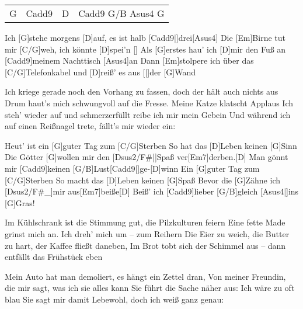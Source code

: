 

\vspace{-0.5em}

\begin{guitar}
	{\footnotesize\begin{tabular}{l|l|l|l}
			G & Cadd9 & D & Cadd9 G/B Asus4 G
	\end{tabular}}

	Ich [G]stehe morgens [D]auf, es ist halb [Cadd9|]{drei}[Asus4]{}
	Die [Em]Birne tut mir [C/G]weh, ich könnte [D]spei'n []{}
	Als [G]erstes hau' ich [D]mir den Fuß an [Cadd9]meinem Nachttisch [Asus4]an
	Dann [Em]stolpere ich über das [C/G]Telefonkabel und [D]reiß' es aus [|]{der} [G]Wand
	
	Ich kriege gerade noch den Vorhang zu fassen, doch der hält auch nichts aus
	Drum haut's mich schwungvoll auf die Fresse. Meine Katze klatscht Applaus
	Ich steh' wieder auf und schmerzerfüllt reibe ich mir mein Gebein
	Und während ich auf einen Reißnagel trete, fällt's mir wieder ein:
	
	Heut' ist ein [G]guter Tag zum [C/G]Sterben
	So hat das [D]Leben keinen [G]Sinn
	Die Götter [G]wollen mir den [Dsus2/F#|]{Spaß} ver[Em7]derben.[D]{}
	Man gönnt mir [Cadd9]keinen [G/B]Lust[Cadd9|]{ge-}[D]winn
	Ein [G]guter Tag zum [C/G]Sterben
	So macht das [D]Leben keinen [G]Spaß
	Bevor die [G]Zähne ich [Dsus2/F#_]{mir aus}[Em7]beiße[D]{}
	Beiß' ich [Cadd9]lieber [G/B]gleich [Asus4|]{ins} [G]Gras!
	
	Im Kühlschrank ist die Stimmung gut, die Pilzkulturen feiern
	Eine fette Made grinst mich an. Ich dreh' mich um – zum Reihern
	Die Eier zu weich, die Butter zu hart, der Kaffee fließt daneben,
	Im Brot tobt sich der Schimmel aus – dann entfällt das Frühstück eben
	
	Mein Auto hat man demoliert, es hängt ein Zettel dran,
	Von meiner Freundin, die mir sagt, was ich sie alles kann
	Sie führt die Sache näher aus: Ich wäre zu oft blau
	Sie sagt mir damit Lebewohl, doch ich weiß ganz genau:
	

\end{guitar}
